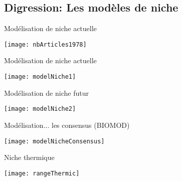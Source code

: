 \documentclass[]{beamer}
\begin{document}
\subsection{Digression: Les modèles de niche}

\begin{frame}{Modélisation de niche actuelle}
  \begin{center}
   \texttt{[image: nbArticles1978]}
  \end{center}
\end{frame}


\begin{frame}{Modélisation de niche actuelle}
  \begin{center}
   \texttt{[image: modelNiche1]}
  \end{center}
\end{frame}

\begin{frame}{Modélisation de niche futur}
  \begin{center}
   \texttt{[image: modelNiche2]}
  \end{center}
\end{frame}


\begin{frame}{Modélisation... les consensus (BIOMOD)}
  \begin{center}
   \texttt{[image: modelNicheConsensus]}
  \end{center}
\end{frame}

\begin{frame}{Niche thermique}
  \begin{center}
   \texttt{[image: rangeThermic]}
  \end{center}

\end{frame}
\end{document}
